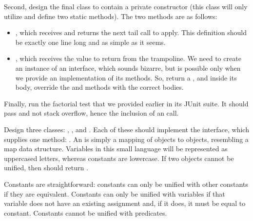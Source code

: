 Second, design the  final class to contain a private constructor (this class will only utilize and define two static methods). The two methods are as follows:

\begin{itemize}
  \item {}, which receives and returns the next tail call to apply. This definition should be exactly one line long and as simple as it seems.
  \item {}, which receives the value to return from the trampoline. We need to create an instance of an interface, which sounds bizarre, but is possible only when we provide an implementation of its methods. So, return a , and inside its body, override the  and  methods with the correct bodies.
\end{itemize}

Finally, run the factorial test that we provided earlier in its JUnit suite. It should pass and not stack overflow, hence the inclusion of an  call.


Design three classes: , , and . Each of these should implement the  interface, which supplies one method: . An  is simply a mapping of  objects to  objects, resembling a map data structure. Variables in this small language will be represented as uppercased letters, whereas constants are lowercase. If two  objects cannot be unified, then  should return .

Constants are straightforward: constants can only be unified with other constants if they are equivalent. Constants can only be unified with variables if that variable does not have an existing assignment and, if it does, it must be equal to  constant. Constants cannot be unified with predicates.

